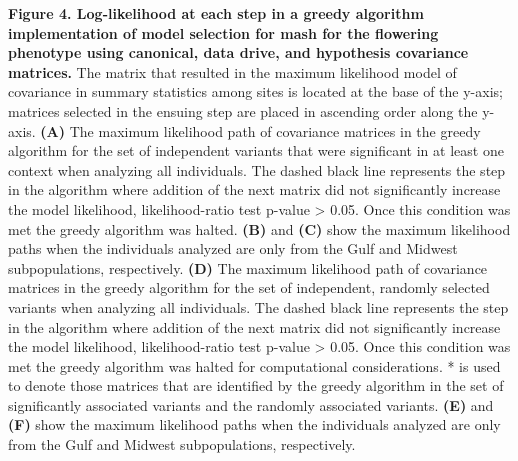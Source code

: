 \documentclass[
  letterpaper,
  DIV=11,
  numbers=noendperiod]{scrartcl}
\begin{document}
\textbf{Figure 4. Log-likelihood at each step in a greedy algorithm
implementation of model selection for mash for the flowering phenotype
using canonical, data drive, and hypothesis covariance matrices.} The
matrix that resulted in the maximum likelihood model of covariance in
summary statistics among sites is located at the base of the y-axis;
matrices selected in the ensuing step are placed in ascending order
along the y-axis. \textbf{(A)} The maximum likelihood path of covariance
matrices in the greedy algorithm for the set of independent variants
that were significant in at least one context when analyzing all
individuals. The dashed black line represents the step in the algorithm
where addition of the next matrix did not significantly increase the
model likelihood, likelihood-ratio test p-value \textgreater{} 0.05.
Once this condition was met the greedy algorithm was halted.
\textbf{(B)} and \textbf{(C)} show the maximum likelihood paths when the
individuals analyzed are only from the Gulf and Midwest subpopulations,
respectively. \textbf{(D)} The maximum likelihood path of covariance
matrices in the greedy algorithm for the set of independent, randomly
selected variants when analyzing all individuals. The dashed black line
represents the step in the algorithm where addition of the next matrix
did not significantly increase the model likelihood, likelihood-ratio
test p-value \textgreater{} 0.05. Once this condition was met the greedy
algorithm was halted for computational considerations. * is used to
denote those matrices that are identified by the greedy algorithm in the
set of significantly associated variants and the randomly associated
variants. \textbf{(E)} and \textbf{(F)} show the maximum likelihood
paths when the individuals analyzed are only from the Gulf and Midwest
subpopulations, respectively.
\end{document}
